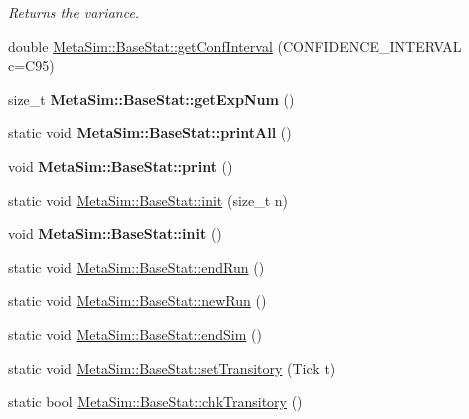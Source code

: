 \begin{DoxyCompactItemize}
\begin{DoxyCompactList}\small\item\em Returns the variance. \end{DoxyCompactList}\item 
double \hyperlink{group__metasim__stat_ga27e74d139c9f265aa0d6427ed2d546f8}{Meta\+Sim\+::\+Base\+Stat\+::get\+Conf\+Interval} (C\+O\+N\+F\+I\+D\+E\+N\+C\+E\+\_\+\+I\+N\+T\+E\+R\+V\+AL c=C95)
\item 
size\+\_\+t {\bfseries Meta\+Sim\+::\+Base\+Stat\+::get\+Exp\+Num} ()\hypertarget{group__metasim__stat_gadf847dce4dbd4cf08444caa1caa894af}{}\label{group__metasim__stat_gadf847dce4dbd4cf08444caa1caa894af}

\item 
static void {\bfseries Meta\+Sim\+::\+Base\+Stat\+::print\+All} ()\hypertarget{group__metasim__stat_gaa94a187b46952731b0caa5306da76512}{}\label{group__metasim__stat_gaa94a187b46952731b0caa5306da76512}

\item 
void {\bfseries Meta\+Sim\+::\+Base\+Stat\+::print} ()\hypertarget{group__metasim__stat_ga27ab96982217cae4c18075aa7d17eb2f}{}\label{group__metasim__stat_ga27ab96982217cae4c18075aa7d17eb2f}

\item 
static void \hyperlink{group__metasim__stat_gacde8a3231d53a08919f79f6e7de34f14}{Meta\+Sim\+::\+Base\+Stat\+::init} (size\+\_\+t n)
\item 
void {\bfseries Meta\+Sim\+::\+Base\+Stat\+::init} ()\hypertarget{group__metasim__stat_ga58c334050705733e8bed8135c783b119}{}\label{group__metasim__stat_ga58c334050705733e8bed8135c783b119}

\item 
static void \hyperlink{group__metasim__stat_gadf8350d5f8be46ce1ef72e24e4b68fdf}{Meta\+Sim\+::\+Base\+Stat\+::end\+Run} ()
\item 
static void \hyperlink{group__metasim__stat_gaba33ca71604bba99e4204f0315079544}{Meta\+Sim\+::\+Base\+Stat\+::new\+Run} ()
\item 
static void \hyperlink{group__metasim__stat_ga76adedc2cd26b03eae9274c628472c3b}{Meta\+Sim\+::\+Base\+Stat\+::end\+Sim} ()
\item 
static void \hyperlink{group__metasim__stat_ga781ebbe2f6730a933ca4b950a40aa612}{Meta\+Sim\+::\+Base\+Stat\+::set\+Transitory} (Tick t)
\item 
static bool \hyperlink{group__metasim__stat_ga056cb5982708aff3ee784116e01b4e46}{Meta\+Sim\+::\+Base\+Stat\+::chk\+Transitory} ()\hypertarget{group__metasim__stat_ga056cb5982708aff3ee784116e01b4e46}{}\label{group__metasim__stat_ga056cb5982708aff3ee784116e01b4e46}


\end{DoxyCompactItemize}

